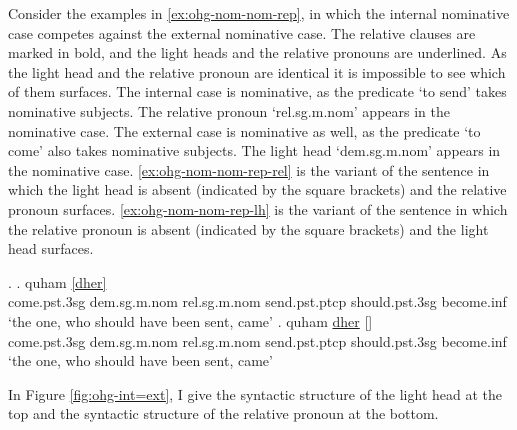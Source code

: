 Consider the examples in \ref{ex:ohg-nom-nom-rep}, in which the internal nominative case competes against the external nominative case. The relative clauses are marked in bold, and the light heads and the relative pronouns are underlined. As the light head and the relative pronoun are identical it is impossible to see which of them surfaces.
The internal case is nominative, as the predicate  `to send' takes nominative subjects. The relative pronoun  `\ac{rel}.\ac{sg}.\ac{m}.\ac{nom}' appears in the nominative case.
The external case is nominative as well, as the predicate  `to come' also takes nominative subjects. The light head  `\ac{dem}.\ac{sg}.\ac{m}.\ac{nom}' appears in the nominative case.
\ref{ex:ohg-nom-nom-rep-rel} is the variant of the sentence in which the light head is absent (indicated by the square brackets) and the relative pronoun surfaces.
\ref{ex:ohg-nom-nom-rep-lh} is the variant of the sentence in which the relative pronoun is absent (indicated by the square brackets) and the light head surfaces.

\ex.\label{ex:ohg-nom-nom-rep}
\ag. quham \underline{[dher]}  \underline{}  \\
 come.\ac{pst}.3\ac{sg}\scsub{[nom]} \ac{dem}.\ac{sg}.\ac{m}.\ac{nom} \ac{rel}.\ac{sg}.\ac{m}.\ac{nom} send.\ac{pst}.\ac{ptcp}\scsub{[nom]} should.\ac{pst}.3\ac{sg} become.\ac{inf}\\
 `the one, who should have been sent, came' \label{ex:ohg-nom-nom-rep-rel}
\bg. quham \underline{dher} [] \underline{}  \\
 come.\ac{pst}.3\ac{sg}\scsub{[nom]} \ac{dem}.\ac{sg}.\ac{m}.\ac{nom} \ac{rel}.\ac{sg}.\ac{m}.\ac{nom} send.\ac{pst}.\ac{ptcp}\scsub{[nom]} should.\ac{pst}.3\ac{sg} become.\ac{inf}\\
 `the one, who should have been sent, came' \label{ex:ohg-nom-nom-rep-lh}

In Figure \ref{fig:ohg-int=ext}, I give the syntactic structure of the light head at the top and the syntactic structure of the relative pronoun at the bottom.

